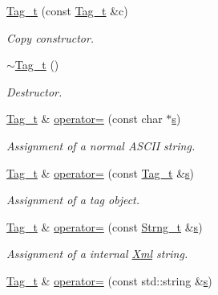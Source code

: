 \begin{DoxyCompactItemize}
\item 
\hyperlink{class_d_d4hep_1_1_x_m_l_1_1_tag__t_a098fcb4e75ad5b52a8f02e10e5672ad9}{Tag\+\_\+t} (const \hyperlink{class_d_d4hep_1_1_x_m_l_1_1_tag__t}{Tag\+\_\+t} \&c)
\begin{DoxyCompactList}\small\item\em Copy constructor. \end{DoxyCompactList}\item 
\hyperlink{class_d_d4hep_1_1_x_m_l_1_1_tag__t_aa35071670ab5dcfe1c20aa8370c818a7}{$\sim$\+Tag\+\_\+t} ()
\begin{DoxyCompactList}\small\item\em Destructor. \end{DoxyCompactList}\item 
\hyperlink{class_d_d4hep_1_1_x_m_l_1_1_tag__t}{Tag\+\_\+t} \& \hyperlink{class_d_d4hep_1_1_x_m_l_1_1_tag__t_a170961001c2a13473b9258cd92a27faf}{operator=} (const char $\ast$\hyperlink{_volumes_8cpp_a17ca6bfc8040d695d3cada22a4763d40}{s})
\begin{DoxyCompactList}\small\item\em Assignment of a normal A\+S\+C\+II string. \end{DoxyCompactList}\item 
\hyperlink{class_d_d4hep_1_1_x_m_l_1_1_tag__t}{Tag\+\_\+t} \& \hyperlink{class_d_d4hep_1_1_x_m_l_1_1_tag__t_a1869e32e13504b08283ca87cfc1ad82a}{operator=} (const \hyperlink{class_d_d4hep_1_1_x_m_l_1_1_tag__t}{Tag\+\_\+t} \&\hyperlink{_volumes_8cpp_a17ca6bfc8040d695d3cada22a4763d40}{s})
\begin{DoxyCompactList}\small\item\em Assignment of a tag object. \end{DoxyCompactList}\item 
\hyperlink{class_d_d4hep_1_1_x_m_l_1_1_tag__t}{Tag\+\_\+t} \& \hyperlink{class_d_d4hep_1_1_x_m_l_1_1_tag__t_af2111caa12315241c91c1414566aad0b}{operator=} (const \hyperlink{class_d_d4hep_1_1_x_m_l_1_1_strng__t}{Strng\+\_\+t} \&\hyperlink{_volumes_8cpp_a17ca6bfc8040d695d3cada22a4763d40}{s})
\begin{DoxyCompactList}\small\item\em Assignment of a internal \hyperlink{union_xml}{Xml} string. \end{DoxyCompactList}\item 
\hyperlink{class_d_d4hep_1_1_x_m_l_1_1_tag__t}{Tag\+\_\+t} \& \hyperlink{class_d_d4hep_1_1_x_m_l_1_1_tag__t_a75956372cda85919960d01308ead3b53}{operator=} (const std\+::string \&\hyperlink{_volumes_8cpp_a17ca6bfc8040d695d3cada22a4763d40}{s})

\end{DoxyCompactItemize}
